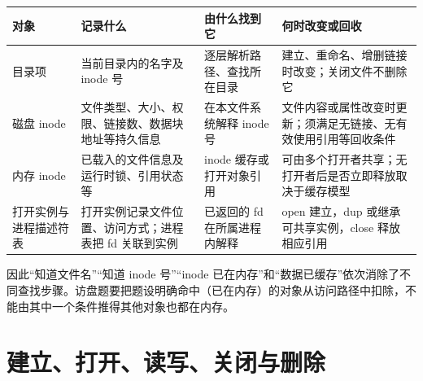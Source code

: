 \begin{wideblock}

\par\medskip\noindent\begin{minipage}{\linewidth}\fontsize{9.3}{12}\selectfont\begin{tabularx}{\linewidth}{@{}YYYY@{}}
\toprule\noalign{}
\begin{minipage}[b]{\linewidth}\raggedright
对象
\end{minipage} & \begin{minipage}[b]{\linewidth}\raggedright
记录什么
\end{minipage} & \begin{minipage}[b]{\linewidth}\raggedright
由什么找到它
\end{minipage} & \begin{minipage}[b]{\linewidth}\raggedright
何时改变或回收
\end{minipage} \\
\midrule\noalign{}


目录项 & 当前目录内的名字及 inode 号 & 逐层解析路径、查找所在目录 & 建立、重命名、增删链接时改变；关闭文件不删除它 \\
磁盘 inode & 文件类型、大小、权限、链接数、数据块地址等持久信息 & 在本文件系统解释 inode 号 & 文件内容或属性改变时更新；须满足无链接、无有效使用引用等回收条件 \\
内存 inode & 已载入的文件信息及运行时锁、引用状态等 & inode 缓存或打开对象引用 & 可由多个打开者共享；无打开者后是否立即释放取决于缓存模型 \\
打开实例与进程描述符表 & 打开实例记录文件位置、访问方式；进程表把 fd 关联到实例 & 已返回的 fd 在所属进程内解释 & open 建立，dup 或继承可共享实例，close 释放相应引用 \\
\bottomrule\end{tabularx}
\end{minipage}\par\medskip

\end{wideblock}

因此``知道文件名''``知道 inode 号''``inode 已在内存''和``数据已缓存''依次消除了不同查找步骤。访盘题要把题设明确命中（已在内存）的对象从访问路径中扣除，不能由其中一个条件推得其他对象也都在内存。

\section{建立、打开、读写、关闭与删除}\label{OS04-6-2}

